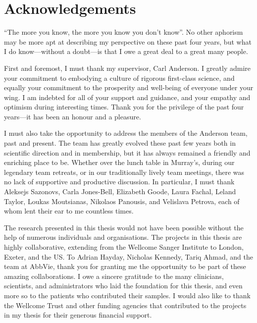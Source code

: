 %
%

\chapter{Acknowledgements}

\enquote{The more you know, the more you know you don't know}.
No other aphorism may be more apt at describing my perspective on these past four years,
but what I do know---without a doubt---is that I owe a great deal to a great many people.

First and foremost, I must thank my supervisor, Carl Anderson.
I greatly admire your commitment to embodying a culture of rigorous first-class science,
and equally your commitment to the prosperity and well-being of everyone under your wing. 
I am indebted for all of your support and guidance, 
and your empathy and optimism during interesting times.
Thank you for the privilege of the past four years---it has been an honour and a pleasure.

I must also take the opportunity to address the members of the Anderson team, past and present.
The team has greatly evolved these past few years both in scientific direction and in membership,
but it has always remained a friendly and enriching place to be. 
Whether over the lunch table in Murray's,
during our legendary team retreats,
or in our traditionally lively team meetings,
there was no lack of supportive and productive discussion.
In particular, I must thank
    Aleksejs Sazonovs,
    Carla Jones-Bell,
    Elizabeth Goode,
    Laura Fachal,
    Leland Taylor,
    Loukas Moutsianas, 
    Nikolaos Panousis,
    and Velislava Petrova,
    each of whom lent their ear to me countless times.

The research presented in this thesis would not have been possible without the help of numerous individuals and organisations.
The projects in this thesis are highly collaborative, extending from the Wellcome Sanger Institute to London, Exeter, and the US.
To Adrian Hayday, Nicholas Kennedy, Tariq Ahmad, and the team at AbbVie, 
thank you for granting me the opportunity to be part of these amazing collaborations.
I owe a sincere gratitude to the many clinicians, scientists, and administrators who laid the foundation for this thesis,
and even more so to the patients who contributed their samples.
I would also like to thank the Wellcome Trust and other funding agencies that contributed to the projects in my thesis for their generous financial support.

